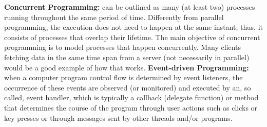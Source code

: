 \documentclass[conference]{IEEEtran}
\begin{document}
\textbf{Concurrent Programming:} can be outlined as many (at least two) processes running throughout the same period of time. Differently from parallel programming, the execution does not need to happen at the same instant, thus, it consists of processes that overlap their lifetime. The main objective of concurrent programming is to model processes that happen concurrently. Many clients fetching data in the same time span from a server (not necessarily in parallel) would be a good example of how that works.
\textbf{Event-driven Programming:} when a computer program control flow is determined by event listeners, the occurrence of these events are observed (or monitored) and executed by an, so called, event handler, which is typically a callback (delegate function) or method that determines the course of the program through user actions such as clicks or key presses or through messages sent by other threads and/or programs.
\end{document}
